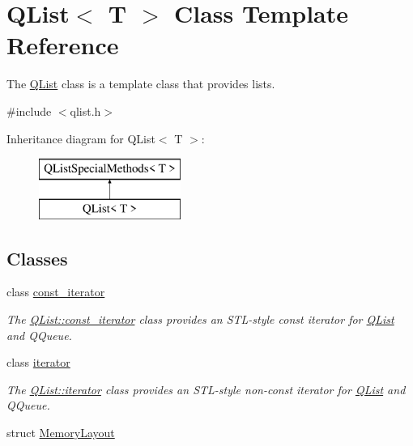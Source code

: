 \hypertarget{class_q_list}{}\section{Q\+List$<$ T $>$ Class Template Reference}
\label{class_q_list}


The \hyperlink{class_q_list}{Q\+List} class is a template class that provides lists.  




{\ttfamily \#include $<$qlist.\+h$>$}

Inheritance diagram for Q\+List$<$ T $>$\+:\begin{figure}[H]
\begin{center}
\leavevmode
\includegraphics[height=2.000000cm]{class_q_list}
\end{center}
\end{figure}
\subsection*{Classes}
\begin{DoxyCompactItemize}
\item 
class \hyperlink{class_q_list_1_1const__iterator}{const\+\_\+iterator}
\begin{DoxyCompactList}\small\item\em The \hyperlink{class_q_list_1_1const__iterator}{Q\+List\+::const\+\_\+iterator} class provides an S\+T\+L-\/style const iterator for \hyperlink{class_q_list}{Q\+List} and Q\+Queue. \end{DoxyCompactList}\item 
class \hyperlink{class_q_list_1_1iterator}{iterator}
\begin{DoxyCompactList}\small\item\em The \hyperlink{class_q_list_1_1iterator}{Q\+List\+::iterator} class provides an S\+T\+L-\/style non-\/const iterator for \hyperlink{class_q_list}{Q\+List} and Q\+Queue. \end{DoxyCompactList}\item 
struct \hyperlink{struct_q_list_1_1_memory_layout}{Memory\+Layout}
\end{DoxyCompactItemize}
